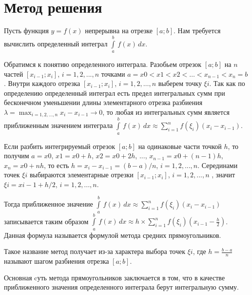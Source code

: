 \documentclass{report}
\begin{document}
\section*{Метод решения}
Пусть функция $y = f(x)$ непрерывна на отрезке $[a; b]$. Нам требуется вычислить определенный
интеграл $\int\limits_a^b\,f(x)\,dx$.
\par Обратимся к понятию определенного интеграла. Разобьем отрезок $[a; b]$ на $n$ частей $[x_{i-1}; x_{i}]$, $i = 1, 2, ..., n$ точками $a = x0 < x1 < x2 < … < x_{n-1} < x_{n} = b$. Внутри каждого отрезка $[x_{i-1}; x_{i}]$, $i =1, 2,…,n$ выберем точку $\xi{i}$. Так как по определению определенный интеграл есть предел интегральных сумм при бесконечном уменьшении длины элементарного отрезка разбиения $\lambda = \max_{i = 1,2,...,n} x_{i} - x_{i-1} \rightarrow 0$, то любая из интегральных сумм является приближенным значением интеграла $\int\limits_a^b\,f(x)\,dx\approx\sum_{i=1}^n f(\xi_{i})(x_{i}-x_{i-1})$.
\par Если разбить интегрируемый отрезок $[a; b]$ на одинаковые части точкой $h$, то получим $a = x0$, $x1=x0+h$, $x2=x0+2h$, $...$, $x_{n-1}=x0+(n-1)h$, $x_{n}=x0+nh$, то есть $h = x_{i}- x_{i-1} = (b-a)/n$, $i=1, 2, ..., n$. Серединами точек $\xi{i}$ выбираются элементарные отрезки $[x_{i-1}; x_{i}]$, $i = 1, 2, ..., n$ , значит $\xi{i}=xi-1 + h/2$, $i=1, 2,..., n$.
\par Тогда приближенное значение $\int\limits_a^b\,f(x)\,dx\approx\sum_{i=1}^n f(\xi_{i}) (x_{i}-x_{i-1})$ записывается таким образом  $\int\limits_a^b\,f(x)\,dx\approx h \times \sum_{i=1}^n f(\xi_{i}) (x_{i-1} - \frac{h}{2})$. Данная формула называется формулой метода средних прямоугольников.
\par Такое название метод получает из-за характера выбора точек $\xi{i}$, где $h=\frac{b-a}{n}$ называют шагом разбиения отрезка $[a; b]$.
\par Основная cуть метода прямоугольников заключается в том, что в качестве приближенного значения определенного интеграла берут интегральную сумму.
\newpage
\end{document}
